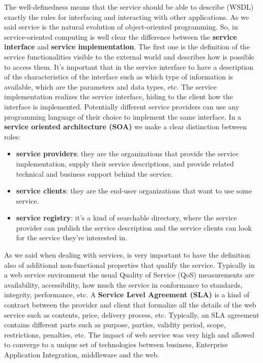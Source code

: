 The well-definedness means that the service should be able to describe (WSDL) exactly the rules for interfacing and interacting with other applications.
As we said service is the natural evolution of object-oriented programming.
So, in service-oriented computing is well clear the difference between the \textbf{service interface} and \textbf{service implementation}.
The first one is the definition of the service functionalities visible to the external world and describes how is possible to access them.
It's important that in the service interface to have a description of the characteristics of the interface such as which type of information is available, which are the parameters and data types, etc.
The service implementation realizes the service interface, hiding to the client how the interface is implemented.
Potentially different service providers can use any programming language of their choice to implement the same interface.
In a \textbf{service oriented architecture (SOA)} we make a clear distinction between roles:
\begin{itemize}
    \item \textbf{service providers}: they are the organizations that provide the service implementation, supply their service descriptions, and provide related technical and business support behind the service.
    \item \textbf{service clients}: they are the end-user organizations that want to use some service.
    \item \textbf{service registry}: it's a kind of searchable directory, where the service provider can publish the service description and the service clients can look for the service they're interested in.
\end{itemize}
As we said when dealing with services, is very important to have the definition also of additional non-functional properties that qualify the service. Typically in a web service environment the usual Quality of Service (QoS) measurements are availability, accessibility, how much the service in conformance to standards, integrity, performance, etc.
A \textbf{Service Level Agreement (SLA)} is a kind of contract between the provider and client that formalize all the details of the web service such as contents, price, delivery process, etc.
Typically, an SLA agreement contains different parts such as purpose, parties, validity period, scope, restrictions, penalties, etc.
The impact of web service was very high and allowed to converge to a unique set of technologies between business, Enterprise Application Integration, middleware and the web.
